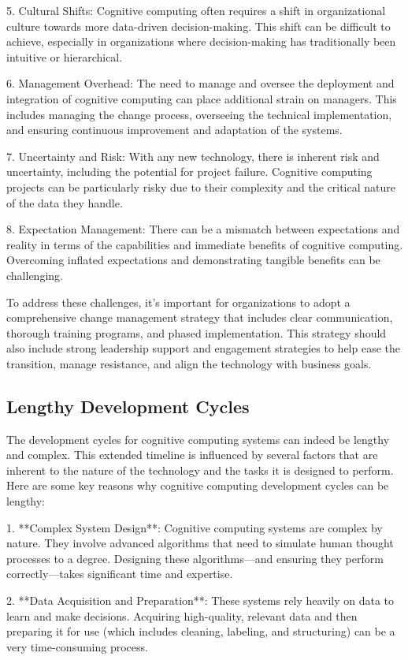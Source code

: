 \documentclass{article}
\begin{document}
\begin{enumerate}
5. Cultural Shifts: Cognitive computing often requires a shift in organizational culture towards more data-driven decision-making. This shift can be difficult to achieve, especially in organizations where decision-making has traditionally been intuitive or hierarchical.

6. Management Overhead: The need to manage and oversee the deployment and integration of cognitive computing can place additional strain on managers. This includes managing the change process, overseeing the technical implementation, and ensuring continuous improvement and adaptation of the systems.

7. Uncertainty and Risk: With any new technology, there is inherent risk and uncertainty, including the potential for project failure. Cognitive computing projects can be particularly risky due to their complexity and the critical nature of the data they handle.

8. Expectation Management: There can be a mismatch between expectations and reality in terms of the capabilities and immediate benefits of cognitive computing. Overcoming inflated expectations and demonstrating tangible benefits can be challenging.

To address these challenges, it's important for organizations to adopt a comprehensive change management strategy that includes clear communication, thorough training programs, and phased implementation. This strategy should also include strong leadership support and engagement strategies to help ease the transition, manage resistance, and align the technology with business goals.

\subsection{Lengthy Development Cycles}
The development cycles for cognitive computing systems can indeed be lengthy and complex. This extended timeline is influenced by several factors that are inherent to the nature of the technology and the tasks it is designed to perform. Here are some key reasons why cognitive computing development cycles can be lengthy:

1. **Complex System Design**: Cognitive computing systems are complex by nature. They involve advanced algorithms that need to simulate human thought processes to a degree. Designing these algorithms—and ensuring they perform correctly—takes significant time and expertise.

		2. **Data Acquisition and Preparation**: These systems rely heavily on data to learn and make decisions. Acquiring high-quality, relevant data and then preparing it for use (which includes cleaning, labeling, and structuring) can be a very time-consuming process.


\end{enumerate}
\end{document}
